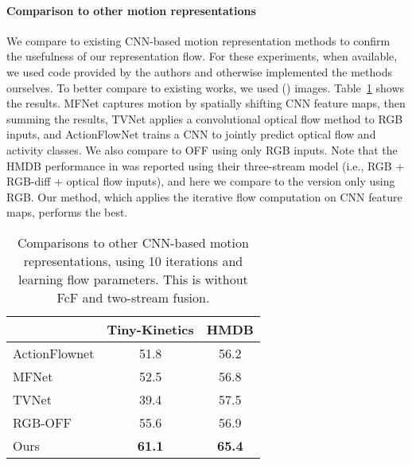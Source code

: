 \documentclass[10pt,twocolumn,letterpaper]{article}
\begin{document}
\paragraph{Comparison to other motion representations} We compare to existing CNN-based motion representation methods to confirm the usefulness of our representation flow. For these experiments, when available, we used code provided by the authors and otherwise implemented the methods ourselves. To better compare to existing works, we used ()  images. Table~\ref{tab:other-motion} shows the results. MFNet \cite{lee2018motion} captures motion by spatially shifting CNN feature maps, then summing the results, TVNet \cite{fan2018end} applies a convolutional optical flow method to RGB inputs, and ActionFlowNet \cite{ng2018actionflownet} trains a CNN to jointly predict optical flow and activity classes. We also compare to OFF \cite{sun2018optical} using only RGB inputs. Note that the HMDB performance in \cite{sun2018optical} was reported using their three-stream model (i.e., RGB + RGB-diff + optical flow inputs), and here we compare to the version only using RGB. Our method, which applies the iterative flow computation on CNN feature maps, performs the best.


\begin{table}
  \caption{Comparisons to other CNN-based motion representations, using 10 iterations and learning flow parameters. This is without FcF and two-stream fusion.}
  \label{tab:other-motion}
  \centering
  \begin{tabular}{lcc}
    \toprule
                                                &  Tiny-Kinetics & HMDB  \\
    \midrule
    ActionFlownet \cite{ng2018actionflownet}   & 51.8 & 56.2 \\
    MFNet \cite{lee2018motion}                 & 52.5 & 56.8 \\
    TVNet \cite{fan2018end}                    & 39.4 & 57.5 \\
    RGB-OFF \cite{sun2018optical}              & 55.6 & 56.9 \\
    Ours                                        & {\bf 61.1} & {\bf 65.4} \\
    \bottomrule
  \end{tabular}
\end{table}
\end{document}
